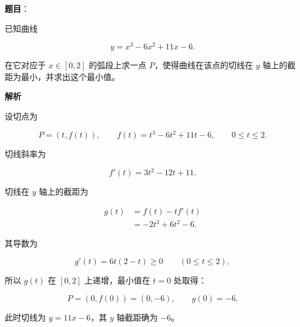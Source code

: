 \begin{answer}

\textbf{题目}：

已知曲线

\nopagebreak[4]
\[
y=x^3-6x^2+11x-6.
\]

在它对应于 $x\in[0,2]$ 的弧段上求一点 $P$，使得曲线在该点的切线在 $y$ 轴上的截距为最小，并求出这个最小值。

\textbf{解析}

设切点为

\nopagebreak[4]
\[
P=(t,f(t)),\qquad
f(t)=t^3-6t^2+11t-6,\qquad 0\le t\le2.
\]

切线斜率为

\nopagebreak[4]
\[
f'(t)=3t^2-12t+11.
\]

切线在 $y$ 轴上的截距为

\nopagebreak[4]
\[
\begin{aligned}
g(t)
&=f(t)-tf'(t)\\
&=-2t^3+6t^2-6.
\end{aligned}
\]

其导数为

\nopagebreak[4]
\[
g'(t)=6t(2-t)\ge0\qquad(0\le t\le2),
\]

所以 $g(t)$ 在 $[0,2]$ 上递增，最小值在 $t=0$ 处取得：

\nopagebreak[4]
\[
P=(0,f(0))=(0,-6),
\qquad
g(0)=-6.
\]

此时切线为 $y=11x-6$，其 $y$ 轴截距确为 $-6$。


\end{answer}